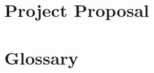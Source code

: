 \documentclass[12pt,twoside,notitlepage]{report}
\begin{document}

\cleardoublepage
\chapter{Project Proposal}













\cleardoublepage
\chapter{Glossary}
\glsaddall
\printglossaries
\end{document}
